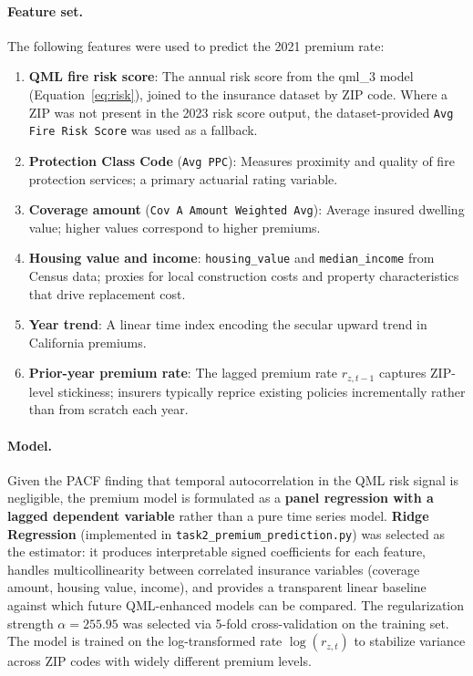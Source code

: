 \documentclass[11pt,a4paper]{article}
\begin{document}
\paragraph{Feature set.}
The following features were used to predict the 2021 premium rate:
\begin{enumerate}[leftmargin=*]
    \item \textbf{QML fire risk score}: The annual risk score from the qml\_3 model
          (Equation~\eqref{eq:risk}), joined to the insurance dataset by ZIP code.
          Where a ZIP was not present in the 2023 risk score output, the dataset-provided
          \texttt{Avg Fire Risk Score} was used as a fallback.
    \item \textbf{Protection Class Code} (\texttt{Avg PPC}): Measures proximity and
          quality of fire protection services; a primary actuarial rating variable.
    \item \textbf{Coverage amount} (\texttt{Cov A Amount Weighted Avg}): Average
          insured dwelling value; higher values correspond to higher premiums.
    \item \textbf{Housing value and income}: \texttt{housing\_value} and
          \texttt{median\_income} from Census data; proxies for local construction
          costs and property characteristics that drive replacement cost.
    \item \textbf{Year trend}: A linear time index encoding the secular upward trend
          in California premiums.
    \item \textbf{Prior-year premium rate}: The lagged premium rate $r_{z,t-1}$
          captures ZIP-level stickiness; insurers typically reprice existing policies
          incrementally rather than from scratch each year.
\end{enumerate}

\paragraph{Model.}
Given the PACF finding that temporal autocorrelation in the QML risk signal
is negligible, the premium model is formulated as a \textbf{panel regression
with a lagged dependent variable} rather than a pure time series model.
\textbf{Ridge Regression} (implemented in \texttt{task2\_premium\_prediction.py})
was selected as the estimator: it produces interpretable signed coefficients
for each feature, handles multicollinearity between correlated insurance
variables (coverage amount, housing value, income), and provides a
transparent linear baseline against which future QML-enhanced models
can be compared.
The regularization strength $\alpha = 255.95$ was selected via 5-fold
cross-validation on the training set.
The model is trained on the log-transformed rate $\log(r_{z,t})$ to
stabilize variance across ZIP codes with widely different premium levels.
\end{document}
